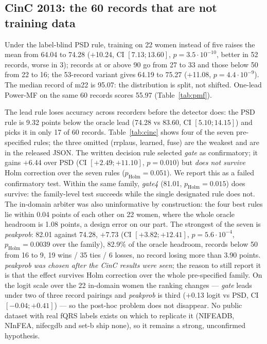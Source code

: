 \documentclass[10pt,twocolumn,a4paper]{article}
\begin{document}
\subsection{CinC 2013: the 60 records that are not training data}
Under the label-blind PSD rule, training on 22 women instead of five raises the mean from 64.04 to
74.28 ($+$10.24, CI $[7.13;13.60]$, $p=3.5\cdot10^{-10}$, better in 52 records, worse in 3); records at
or above 90 go from 27 to 33 and those below 50 from 22 to 16; the 53-record variant gives 64.19 to
75.27 ($+$11.08, $p=4.4\cdot10^{-9}$). The median record of m22 is 95.07: the distribution is split,
not shifted. One-lead Power-MF on the same 60 records scores 55.97 (Table~\ref{tab:pmf}).

The lead rule loses accuracy across recorders before the detector does: the PSD rule is 9.32 points
below the oracle lead (74.28 vs 83.60, CI $[5.10;14.15]$) and picks it in only 17 of 60 records.
Table~\ref{tab:cinc} shows four of the seven pre-specified rules; the three omitted (rrplaus, learned, fuse) are the weakest and are in the released JSON. The written decision rule selected
\emph{gate} as confirmatory; it gains $+$6.44 over PSD (CI $[+2.49;+11.10]$, $p=0.010$) but
\emph{does not survive} Holm correction over the seven rules ($p_{\mathrm{Holm}}=0.051$). We report
this as a failed confirmatory test. Within the same family, \emph{gate4} (81.01, $p_{\mathrm{Holm}}=0.015$) does survive: the family-level test succeeds while the single designated rule does not. The in-domain arbiter was also uninformative by construction: the
four best rules lie within 0.04 points of each other on 22 women, where the whole oracle headroom is
1.08 points, a design error on our part. The strongest of the seven is \emph{peakprob}: 82.01 against
74.28, $+$7.73 (CI $[+3.82;+12.41]$, $p=5.6\cdot10^{-4}$, $p_{\mathrm{Holm}}=0.0039$ over the family),
82.9\% of the oracle headroom, records below 50 from 16 to 9, 19 wins / 35 ties / 6 losses, no record
losing more than 3.90 points. \emph{peakprob was chosen after the CinC results were seen}; the reason
to still report it is that the effect survives Holm correction over the whole pre-specified family. On
the logit scale over the 22 in-domain women the ranking changes --- \emph{gate} leads under two of
three record pairings and \emph{peakprob} is third ($+$0.13 logit vs PSD, CI $[-0.04;+0.41]$) --- so
the post-hoc problem does not disappear. No public dataset with real fQRS labels exists on which to
replicate it (NIFEADB, NInFEA, nifecgdb and set-b ship none), so it remains a strong, unconfirmed
hypothesis.
\end{document}

